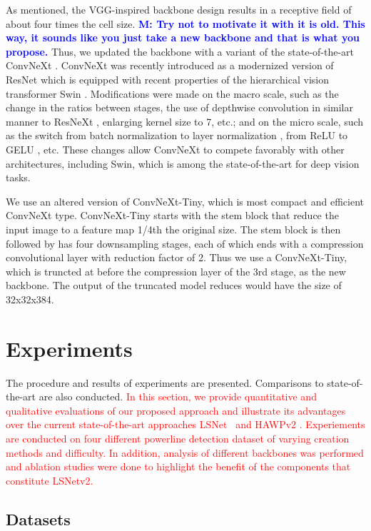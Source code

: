 \documentclass[journal]{IEEEtran}
\newcommand{\commentM}[1]{\textbf{\textcolor{blue}{M: #1}}}
\begin{document}
As mentioned, the VGG-inspired backbone design results in a receptive field of about four times the cell size. \commentM{Try not to motivate it with it is old. This way, it sounds like you just take a new backbone and that is what you propose.} Thus, we updated the backbone with a variant of the state-of-the-art ConvNeXt \cite{convnext}. ConvNeXt was recently introduced as a modernized version of ResNet \cite{resnet} which is equipped with recent properties of the hierarchical vision transformer Swin \cite{swin}. Modifications were made on the macro scale, such as the change in the ratios between stages, the use of depthwise convolution in similar manner to ResNeXt \cite{resnext}, enlarging kernel size to 7, etc.; and on the micro scale, such as the switch from batch normalization \cite{batchnorm} to layer normalization \cite{layernorm}, from ReLU \cite{relu} to GELU \cite{gelu}, etc. These changes allow ConvNeXt to compete favorably with other architectures, including Swin, which is among the state-of-the-art for deep vision tasks.

We use an altered version of ConvNeXt-Tiny, which is most compact and efficient ConvNeXt type. ConvNeXt-Tiny starts with the stem block that reduce the input image to a feature map 1/4th the original size. The stem block is then followed by has four downsampling stages, each of which ends with a compression convolutional layer with reduction factor of 2. Thus we use a ConvNeXt-Tiny, which is truncted at before the compression layer of the 3rd stage, as the new backbone. The output of the truncated model reduces would have the size of 32x32x384.



\section{Experiments}
The procedure and results of experiments are presented. Comparisons to state-of-the-art are also conducted.
\textcolor{red}{In this section, we provide quantitative and qualitative evaluations of our proposed approach and illustrate its advantages over the current state-of-the-art approaches LSNet~\cite{Nguyen2020} and HAWPv2 \cite{hawpv2}. Experiements are conducted on four different powerline detection dataset of varying creation methods and difficulty. In addition, analysis of different backbones was performed and ablation studies were done to highlight the benefit of the components that constitute LSNetv2.}

\subsection{Datasets}
\end{document}
